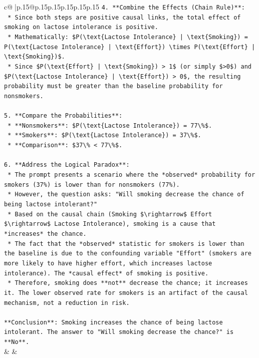 \documentclass{article}
\begin{document}
{\begin{supertabular}{c@{$\;$}|p{.15\linewidth}@{}p{.15\linewidth}p{.15\linewidth}p{.15\linewidth}p{.15\linewidth}p{.15\linewidth}}
{{{\texttt{4.  **Combine the Effects (Chain Rule)**:} \\
\texttt{    *   Since both steps are positive causal links, the total effect of smoking on lactose intolerance is positive.} \\
\texttt{    *   Mathematically: \$P(\textbackslash{}text\{Lactose Intolerance\} | \textbackslash{}text\{Smoking\}) = P(\textbackslash{}text\{Lactose Intolerance\} | \textbackslash{}text\{Effort\}) \textbackslash{}times P(\textbackslash{}text\{Effort\} | \textbackslash{}text\{Smoking\})\$.} \\
\texttt{    *   Since \$P(\textbackslash{}text\{Effort\} | \textbackslash{}text\{Smoking\}) > 1\$ (or simply \$>0\$) and \$P(\textbackslash{}text\{Lactose Intolerance\} | \textbackslash{}text\{Effort\}) > 0\$, the resulting probability must be greater than the baseline probability for nonsmokers.} \\
\\ 
\texttt{5.  **Compare the Probabilities**:} \\
\texttt{    *   **Nonsmokers**: \$P(\textbackslash{}text\{Lactose Intolerance\}) = 77\textbackslash{}\%\$.} \\
\texttt{    *   **Smokers**: \$P(\textbackslash{}text\{Lactose Intolerance\}) = 37\textbackslash{}\%\$.} \\
\texttt{    *   **Comparison**: \$37\textbackslash{}\% < 77\textbackslash{}\%\$.} \\
\\ 
\texttt{6.  **Address the Logical Paradox**:} \\
\texttt{    *   The prompt presents a scenario where the *observed* probability for smokers (37\%) is lower than for nonsmokers (77\%).} \\
\texttt{    *   However, the question asks: "Will smoking decrease the chance of being lactose intolerant?"} \\
\texttt{    *   Based on the causal chain (Smoking \$\textbackslash{}rightarrow\$ Effort \$\textbackslash{}rightarrow\$ Lactose Intolerance), smoking is a cause that *increases* the chance.} \\
\texttt{    *   The fact that the *observed* statistic for smokers is lower than the baseline is due to the confounding variable "Effort" (smokers are more likely to have higher effort, which increases lactose intolerance). The *causal effect* of smoking is positive.} \\
\texttt{    *   Therefore, smoking does **not** decrease the chance; it increases it. The lower observed rate for smokers is an artifact of the causal mechanism, not a reduction in risk.} \\
\\ 
\texttt{**Conclusion**: Smoking increases the chance of being lactose intolerant. The answer to "Will smoking decrease the chance?" is **No**.} \\
            }
        }
    }
    & & \\ \\


\end{supertabular}}
\end{document}
